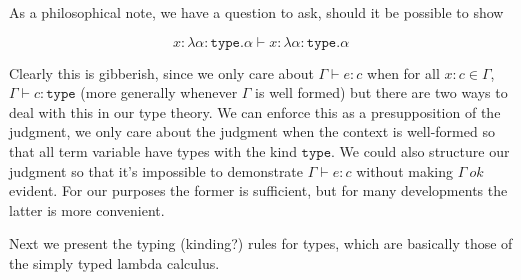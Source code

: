 \documentclass{article}
\newcommand{\type}{\ensuremath{\mathtt{type}}}
\begin{document}

As a philosophical note, we have a question to ask, should it be
possible to show

\[
  x : \lambda \alpha : \type. \alpha \vdash x : \lambda \alpha : \type. \alpha
\]

Clearly this is gibberish, since we only care about
$\Gamma \vdash e : c$ when for all $x : c \in \Gamma$,
$\Gamma \vdash c : \type$ (more generally whenever $\Gamma$ is well
formed) but there are two ways to deal with this in our type
theory. We can enforce this as a presupposition of the judgment, we
only care about the judgment when the context is well-formed so that
all term variable have types with the kind $\type$. We could also
structure our judgment so that it's impossible to demonstrate
$\Gamma \vdash e : c$ without making $\Gamma\ ok$ evident. For our purposes the
former is sufficient, but for many developments the
latter is more convenient.

Next we present the typing (kinding?) rules for types, which are basically those
of the simply typed lambda calculus.

\end{document}
